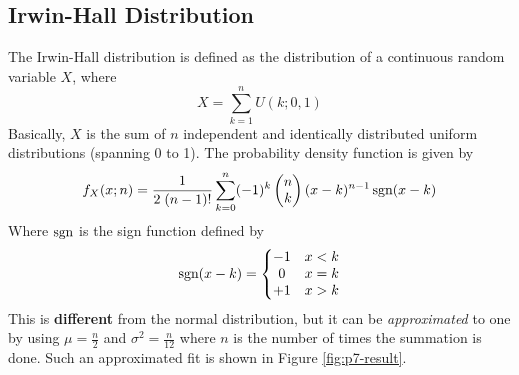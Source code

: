 \documentclass[main.tex]{article}
\begin{document}
    \subsection*{Irwin-Hall Distribution}
    The Irwin-Hall distribution is defined as the distribution of a continuous random variable $X$, where
    \begin{equation}
        X = \sum_{k=1}^{n} U(k; 0, 1)
    \end{equation}
    Basically, $X$ is the sum of $n$ independent and identically distributed uniform distributions (spanning 0 to 1). The probability density function is given by 
    \begin{equation}
        f_X(x; n) = \frac{1}{2\;(n-1)!} \sum_{k=0}^{n} (-1)^{k}
        \begin{pmatrix}
        n \\ 
        k
        \end{pmatrix}
        (x-k)^{n-1}\,\textup{sgn}(x-k)
    \end{equation}
    Where $\textup{sgn}$ is the sign function defined by
    \begin{equation}
        \textup{sgn}(x-k) = \left\{\begin{matrix}
            -1 & x < k \\
            0  & x = k \\
            +1 & x > k
            \end{matrix}\right.
    \end{equation}
    This is \textbf{different} from the normal distribution, but it can be \emph{approximated} to one by using $\mu = \frac{n}{2}$ and $\sigma^2 = \frac{n}{12}$ where $n$ is the number of times the summation is done. Such an approximated fit is shown in Figure \ref{fig:p7-result}.
\end{document}
